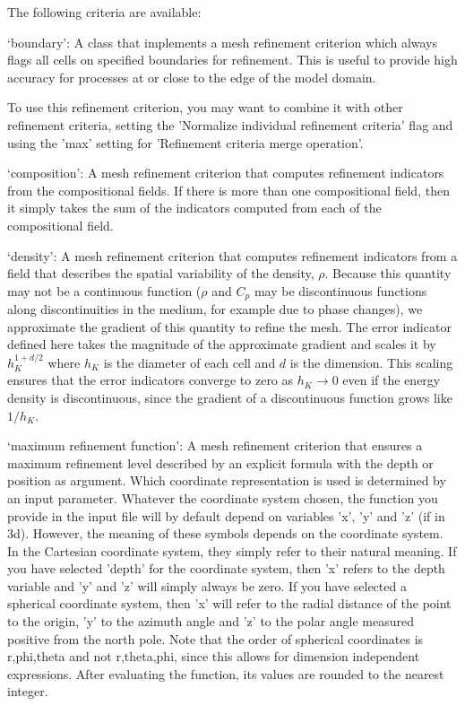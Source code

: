 \begin{itemize}
The following criteria are available:

`boundary': A class that implements a mesh refinement criterion which always flags all cells on specified boundaries for refinement. This is useful to provide high accuracy for processes at or close to the edge of the model domain.

To use this refinement criterion, you may want to combine it with other refinement criteria, setting the 'Normalize individual refinement criteria' flag and using the 'max' setting for 'Refinement criteria merge operation'.

`composition': A mesh refinement criterion that computes refinement indicators from the compositional fields. If there is more than one compositional field, then it simply takes the sum of the indicators computed from each of the compositional field.

`density': A mesh refinement criterion that computes refinement indicators from a field that describes the spatial variability of the density, $\rho$. Because this quantity may not be a continuous function ($\rho$ and $C_p$ may be discontinuous functions along discontinuities in the medium, for example due to phase changes), we approximate the gradient of this quantity to refine the mesh. The error indicator defined here takes the magnitude of the approximate gradient and scales it by $h_K^{1+d/2}$ where $h_K$ is the diameter of each cell and $d$ is the dimension. This scaling ensures that the error indicators converge to zero as $h_K\rightarrow 0$ even if the energy density is discontinuous, since the gradient of a discontinuous function grows like $1/h_K$.

`maximum refinement function': A mesh refinement criterion that ensures a maximum refinement level described by an explicit formula with the depth or position as argument. Which coordinate representation is used is determined by an input parameter. Whatever the coordinate system chosen, the function you provide in the input file will by default depend on variables 'x', 'y' and 'z' (if in 3d). However, the meaning of these symbols depends on the coordinate system. In the Cartesian coordinate system, they simply refer to their natural meaning. If you have selected 'depth' for the coordinate system, then 'x' refers to the depth variable and 'y' and 'z' will simply always be zero. If you have selected a spherical coordinate system, then 'x' will refer to the radial distance of the point to the origin, 'y' to the azimuth angle and 'z' to the polar angle measured positive from the north pole. Note that the order of spherical coordinates is r,phi,theta and not r,theta,phi, since this allows for dimension independent expressions. After evaluating the function, its values are rounded to the nearest integer.


\end{itemize}
